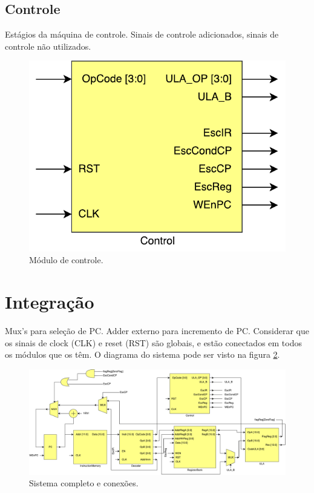 \documentclass[11pt,a4paper,titlepage]{article}
\begin{document}
\subsection{Controle}\label{subsec:imp-ctrl}

Estágios da máquina de controle. Sinais de controle adicionados, sinais de controle não utilizados.

\begin{figure}[!h]
\centering
\includegraphics[scale=0.4]{images/Control.pdf}
\caption{Módulo de controle.}
\label{fig:control}
\end{figure}

\section{Integração}

Mux's para seleção de PC. Adder externo para incremento de PC. Considerar que os sinais de clock (CLK) e reset (RST) são globais, e estão conectados em todos os módulos que os têm. O diagrama do sistema pode ser visto na figura \ref{fig:microprocessor}.

\begin{figure}[h]
\centering
\includegraphics[scale=0.4]{images/Microprocessor.pdf}
\caption{Sistema completo e conexões.}
\label{fig:microprocessor}
\end{figure}
\end{document}
